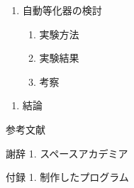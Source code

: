 \documentclass[
  9pt
]{jsarticle}
\providecommand{\tightlist}{%
  \setlength{\itemsep}{0pt}\setlength{\parskip}{0pt}}
\begin{document}
\begin{enumerate}
\def\labelenumi{\arabic{enumi}.}
\setcounter{enumi}{6}
\tightlist
\item
  自動等化器の検討

  \begin{enumerate}
  \def\labelenumii{\arabic{enumii}.}
  \tightlist
  \item
    実験方法
  \item
    実験結果
  \item
    考察
  \end{enumerate}
\end{enumerate}

\begin{enumerate}
\def\labelenumi{\arabic{enumi}.}
\setcounter{enumi}{7}
\tightlist
\item
  結論
\end{enumerate}

参考文献

謝辞 1. スペースアカデミア

付録 1. 制作したプログラム
\end{document}
